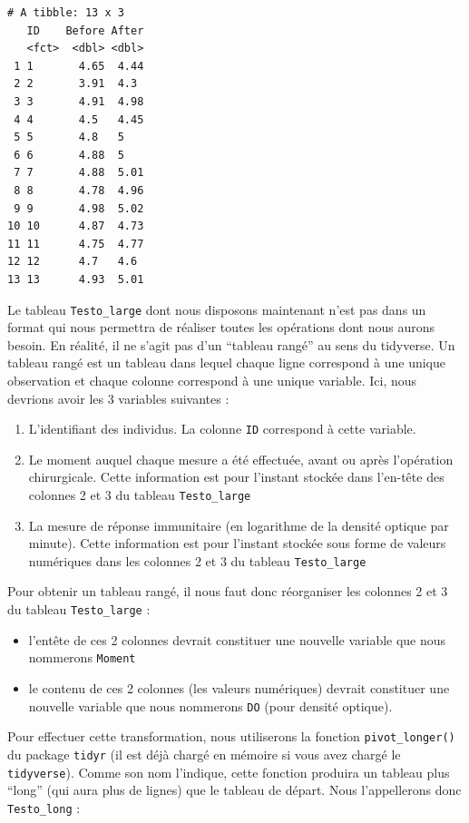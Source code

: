 \documentclass[
  french,
  a4paper,
  DIV=11,
  numbers=noendperiod,
  oneside]{scrreprt}
\providecommand{\tightlist}{%
  \setlength{\itemsep}{0pt}\setlength{\parskip}{0pt}}
\begin{document}
\begin{verbatim}
# A tibble: 13 x 3
   ID    Before After
   <fct>  <dbl> <dbl>
 1 1       4.65  4.44
 2 2       3.91  4.3 
 3 3       4.91  4.98
 4 4       4.5   4.45
 5 5       4.8   5   
 6 6       4.88  5   
 7 7       4.88  5.01
 8 8       4.78  4.96
 9 9       4.98  5.02
10 10      4.87  4.73
11 11      4.75  4.77
12 12      4.7   4.6 
13 13      4.93  5.01
\end{verbatim}

Le tableau \texttt{Testo\_large} dont nous disposons maintenant n'est
pas dans un format qui nous permettra de réaliser toutes les opérations
dont nous aurons besoin. En réalité, il ne s'agit pas d'un ``tableau
rangé'' au sens du tidyverse. Un tableau rangé est un tableau dans
lequel chaque ligne correspond à une unique observation et chaque
colonne correspond à une unique variable. Ici, nous devrions avoir les 3
variables suivantes :

\begin{enumerate}
\def\labelenumi{\arabic{enumi}.}
\tightlist
\item
  L'identifiant des individus. La colonne \texttt{ID} correspond à cette
  variable.
\item
  Le moment auquel chaque mesure a été effectuée, avant ou après
  l'opération chirurgicale. Cette information est pour l'instant stockée
  dans l'en-tête des colonnes 2 et 3 du tableau \texttt{Testo\_large}
\item
  La mesure de réponse immunitaire (en logarithme de la densité optique
  par minute). Cette information est pour l'instant stockée sous forme
  de valeurs numériques dans les colonnes 2 et 3 du tableau
  \texttt{Testo\_large}
\end{enumerate}

Pour obtenir un tableau rangé, il nous faut donc réorganiser les
colonnes 2 et 3 du tableau \texttt{Testo\_large} :

\begin{itemize}
\tightlist
\item
  l'entête de ces 2 colonnes devrait constituer une nouvelle variable
  que nous nommerons \texttt{Moment}
\item
  le contenu de ces 2 colonnes (les valeurs numériques) devrait
  constituer une nouvelle variable que nous nommerons \texttt{DO} (pour
  densité optique).
\end{itemize}

Pour effectuer cette transformation, nous utiliserons la fonction
\texttt{pivot\_longer()} du package \texttt{tidyr} (il est déjà chargé
en mémoire si vous avez chargé le \texttt{tidyverse}). Comme son nom
l'indique, cette fonction produira un tableau plus ``long'' (qui aura
plus de lignes) que le tableau de départ. Nous l'appellerons donc
\texttt{Testo\_long} :
\end{document}
